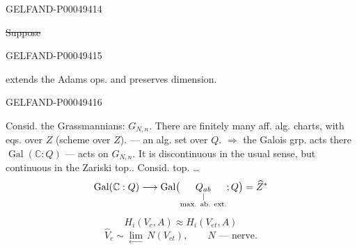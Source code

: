 \begin{GelfandAdjacentEvidence}{GELFAND-P000494}{14}


\sout{Suppose}
\end{GelfandAdjacentEvidence}
\begin{GelfandAdjacentEvidence}{GELFAND-P000494}{15}

extends the Adams ops. and preserves dimension.
\end{GelfandAdjacentEvidence}
\begin{GelfandAdjacentEvidence}{GELFAND-P000494}{16}


Consid. the Grassmannians: $G_{N,n}$.
There are finitely many aff. alg. charts, with eqs. over $Z$ (scheme over $Z$).
— an alg. set over $Q$.
$\Rightarrow$ the Galois grp. acts there $\operatorname{Gal}(\mathbb C:Q)$
— acts on $G_{N,n}$.
It is discontinuous in the usual sense, but continuous in the Zariski top..
Consid.  top. \ldots
\[
\operatorname{Gal}(\mathbb C:Q)\longrightarrow
\operatorname{Gal}\bigl(
\underset{\substack{\vert\\\text{\scriptsize max. ab. ext.}}}{Q_{ab}};Q\bigr)
=\widehat Z^{*}
\]
\end{GelfandAdjacentEvidence}

\[
H_i(V_c,A)\approx H_i(V_{et},A)
\]
\[
\widehat V_c\sim\underset{\longleftarrow}{\lim}\,N(V_{et}),
\qquad N\text{ — nerve}.
\]


